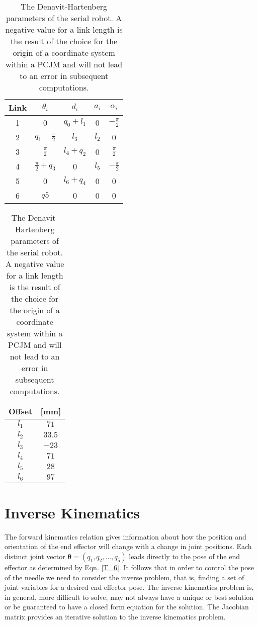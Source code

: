 \begin{table}[h!]
\centering
 \begin{tabular}{|c|c|c|c|c|}
 	\hline
    Link & $\theta_i$ & $d_i$ & $a_i$ & $\alpha_i$\\
    \hline
    1 & 0 & $q_0+l_1$ & 0 & $-\frac{\pi}{2}$\\
    2 & $q_1-\frac{\pi}{2}$ & $l_3$ & $l_2$ & 0\\
    3 & $\frac{\pi}{2}$ & $l_4+q_2$ & 0 & $\frac{\pi}{2}$\\
    4 &$\frac{\pi}{2}+q_3$ & 0 & $l_5$ & $-\frac{\pi}{2}$\\
    5 & 0 & $l_6+q_4$ & 0 & 0\\
    6 & $q5$ & 0 & 0 & 0\\
    \hline
 \end{tabular}
 \begin{tabular}{|c|c|}
 	\hline
    Offset & [mm]\\
    \hline
    $l_1$ & $71$\\
    $l_2$ & $33.5$\\
    $l_3$ & $-23$\\
    $l_4$ & $71$\\
    $l_5$ & $28$\\
    $l_6$ & $97$\\
    \hline
 \end{tabular}
 \caption{The Denavit-Hartenberg parameters of the serial robot. A negative value for a link length is the result of the choice for the origin of a coordinate system within a PCJM and will not lead to an error in subsequent computations.}\label{parameters}
\end{table}

\section{Inverse Kinematics}\label{section_IK}

The forward kinematics relation gives information about how the position and orientation of the end effector will change with a change in joint positions. Each distinct joint vector $\bm{\theta} = (q_1,q_2,...,q_5)$ leads directly to the pose of the end effector as determined by Eqn. \ref{T_6}. It follows that in order to control the pose of the needle we need to consider the inverse problem, that is, finding a set of joint variables for a desired end effector pose. The inverse kinematics problem is, in general, more difficult to solve, may not always have a unique or best solution or be guaranteed to have a closed form equation for the solution. The Jacobian matrix provides an iterative solution to the inverse kinematics problem.

